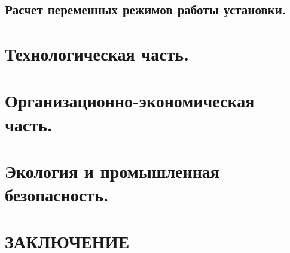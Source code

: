 \documentclass[a4paper,12pt]{article}
\begin{document}
    \subsection{Расчет переменных режимов работы установки.}

    \section{Технологическая часть.}
    \section{Организационно-экономическая часть.}
    \section{Экология и промышленная безопасность.}

    \section{ЗАКЛЮЧЕНИЕ}
\end{document}
